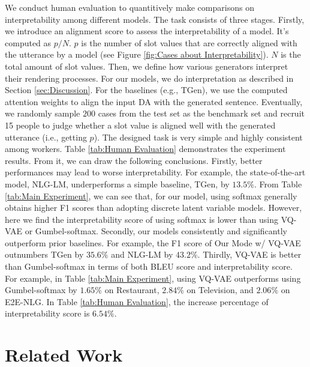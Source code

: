 \documentclass[letterpaper]{article} %
\begin{document}
We conduct human evaluation to quantitively make comparisons on interpretability among different models. The task consists of three stages. Firstly, we introduce an alignment score to assess the interpretability of a model. It's computed as $p / N$. $p$ is the number of slot values that are correctly aligned with the utterance by a model (see Figure \ref{fig:Cases about Interpretability}). $N$ is the total amount of slot values. Then, we define how various generators interpret their rendering processes. For our models, we do interpretation as described in Section \ref{sec:Discussion}. For the baselines (e.g., TGen), we use the computed attention weights to align the input DA with the generated sentence. Eventually, we randomly sample $200$ cases from the test set as the benchmark set and recruit 15 people to judge whether a slot value is aligned well with the generated utterance (i.e., getting $p$). The designed task is very simple and highly consistent among workers.  Table \ref{tab:Human Evaluation} demonstrates the experiment results. From it, we can draw the following conclusions. Firstly, better performances may lead to worse interpretability. For example, the state-of-the-art model, NLG-LM, underperforms a simple baseline, TGen, by $13.5\%$. From Table \ref{tab:Main Experiment}, we can see that, for our model, using softmax generally obtains higher F1 scores than adopting discrete latent variable models. However, here we find the interpretability score of using softmax is lower than using VQ-VAE or Gumbel-softmax. Secondly, our models consistently and significantly outperform prior baselines. For example, the F1 score of Our Mode w/ VQ-VAE outnumbers TGen by $35.6\%$ and NLG-LM by $43.2\%$. Thirdly, VQ-VAE is better than Gumbel-softmax in terms of both BLEU score and interpretability score. For example, in Table \ref{tab:Main Experiment}, using VQ-VAE outperforms using Gumbel-softmax by $1.65\%$ on Restaurant, $2.84\%$ on Television, and $2.06\%$ on E2E-NLG. In Table \ref{tab:Human Evaluation}, the increase percentage of interpretability score is $6.54\%$.

\vspace{-0.79mm}
\section{Related Work}
\end{document}
